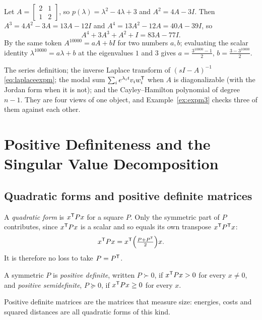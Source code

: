 \documentclass[11pt]{article}
\begin{document}
\begin{example}
Let $A=\begin{bmatrix}2&1\\1&2\end{bmatrix}$, so $p(\lambda)=\lambda^{2}-4\lambda+3$ and
$A^{2}=4A-3I$. Then $A^{3}=4A^{2}-3A=13A-12I$ and $A^{4}=13A^{2}-12A=40A-39I$, so
\[
   A^{4}+3A^{3}+A^{2}+I = 83A-77I .
\]
By the same token $A^{10000}=aA+bI$ for two numbers $a,b$; evaluating the scalar
identity $\lambda^{10000}=a\lambda+b$ at the eigenvalues $1$ and $3$ gives
$a=\frac{3^{10000}-1}{2}$, $b=\frac{3-3^{10000}}{2}$.
\end{example}

\begin{remark}
The series definition; the inverse Laplace transform of $(sI-A)^{-1}$
\eqref{eq:laplaceexpm}; the modal sum $\sum_ie^{\lambda_it}v_iw_i^{\mathsf{T}}$ when $A$ is
diagonalizable (with the Jordan form when it is not); and the Cayley--Hamilton
polynomial of degree $n-1$. They are four views of one object, and
Example~\ref{ex:expm3} checks three of them against each other.
\end{remark}

\section{Positive Definiteness and the Singular Value Decomposition}\label{sec:svd}

\subsection{Quadratic forms and positive definite matrices}\label{sec:pd}
A \emph{quadratic form} is $x^{\mathsf{T}} Px$ for a square $P$. Only the symmetric part of
$P$ contributes, since $x^{\mathsf{T}} Px$ is a scalar and so equals its own transpose
$x^{\mathsf{T}} P^{\mathsf{T}} x$:
\[
   x^{\mathsf{T}} Px = x^{\mathsf{T}}\Bigl(\tfrac{P+P^{\mathsf{T}}}{2}\Bigr)x .
\]
It is therefore no loss to take $P=P^{\mathsf{T}}$.
\begin{definition}
A symmetric $P$ is \emph{positive definite}, written $P\succ0$, if $x^{\mathsf{T}} Px>0$ for
every $x\neq0$, and \emph{positive semidefinite}, $P\succeq0$, if $x^{\mathsf{T}} Px\ge0$
for every $x$.
\end{definition}
Positive definite matrices are the matrices that measure size: energies, costs and
squared distances are all quadratic forms of this kind.
\end{document}
